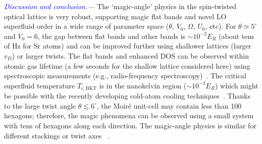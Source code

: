 \documentclass[twocolumn,english,prl,floatfix,citeautoscript,nofootinbib]{revtex4}
\begin{document}

\emph{\textcolor{blue}{Discussion and conclusion}.---}%
The `magic-angle' physics in the spin-twisted optical lattice is
very robust, supporting magic flat bands and novel LO superfluid order in a
wide range of parameter space ($\theta $, $V_{0}$, $\Omega $, $U_{0}$, etc).
For $\theta \simeq 5^{\circ }$ and $V_{0}=6$, the gap between flat bands and
other bands is $\sim 10^{-2}E_{R}$ (about tens of Hz for Sr atoms) and can
be improved further using shallower lattices (larger $v_{D}$) or larger
twists. %
The flat bands and enhanced DOS can be observed within atomic gas lifetime
(a few %
seconds for the shallow lattice considered here) using spectroscopic
measurements (e.g., radio-frequency spectroscopy)~\cite%
{science.1100818,nature07172,nature07176,zhang2014fermi}. The critical
superfluid temperature $T_{c,
\text{BKT}}$ is in the nanokelvin region ($\sim
10^{-3}E_{R}$) which might be possible with the recently developing
cold-atom cooling techniques~\cite%
{annurev.Esslinger,science.1236362,nature22362,science.aaz6801}. Thanks to
the large twist angle $\theta \lesssim 6^{\circ }$, the Moir\'{e} unit-cell
may contain less than 100 hexagons; therefore, the magic phenomena can be
observed using a small system with tens of hexagons along each direction.
The magic-angle physics is similar for different stackings or twist axes~%
\cite{SM}.
\end{document}

